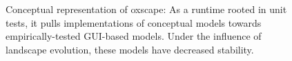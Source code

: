 \documentclass[a4paper]{article} %
\begin{document}



























\begin{figure}
    \begin{center}
        
    \end{center}
    \caption{Conceptual representation of oxscape: As a runtime rooted in unit tests, it pulls implementations of conceptual models towards empirically-tested GUI-based models. Under the influence of landscape evolution, these models have decreased stability.}\label{fig:next}
\end{figure}
\end{document}
